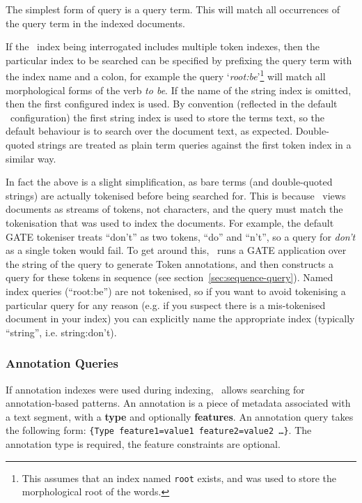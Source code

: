 The simplest form of query is a query term. This will match all occurrences of
the query term in the indexed documents.

If the \Mimir\ index being interrogated includes multiple token indexes, then
the particular index to be searched can be specified by prefixing the query
term with the index name and a colon, for example the query
`{\it root:be}'\footnote{This assumes that an index named {\tt root} exists,
and was used to store the morphological root of the words.} will match all
morphological forms of the verb {\it to be}. If the name of the string index is
omitted, then the first configured index is used. By convention (reflected in
the default \Mimir\ configuration) the first string index is used to store the
terms text, so the default behaviour is to search over the document text, as
expected.  Double-quoted strings are treated as plain term queries against the
first token index in a similar way.

In fact the above is a slight simplification, as bare terms (and double-quoted
strings) are actually tokenised before being searched for.  This is because
\Mimir\ views documents as streams of tokens, not characters, and the query
must match the tokenisation that was used to index the documents.  For example,
the default GATE tokeniser treats ``don't'' as two tokens, ``do'' and ``n't'',
so a query for {\em don't} as a single token would fail.  To get around this,
\Mimir\ runs a GATE application over the string of the query to generate
Token annotations, and then constructs a query for these tokens in sequence
(see section~\ref{sec:sequence-query}).  Named index queries (``root:be'') are
not tokenised, so if you want to avoid tokenising a particular query for any
reason (e.g. if you suspect there is a mis-tokenised document in your index)
you can explicitly name the appropriate index (typically ``string'', i.e.
string:don't).

\subsubsection{Annotation Queries}\label{sec:annotation-query}

If annotation indexes were used during indexing, \Mimir\ allows searching for
annotation-based patterns. An annotation is a piece of metadata
associated with a text segment, with a {\bf type} and optionally
{\bf features}.  An annotation query takes the following form: 
{\tt \{Type feature1=value1 feature2=value2 \ldots\}}.  The annotation type is
required, the feature constraints are optional.

